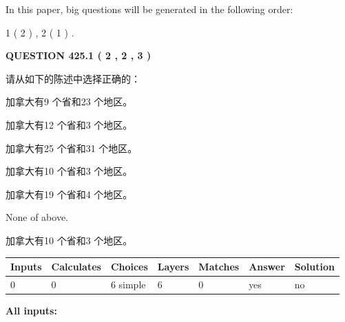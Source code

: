 \documentclass{ctexart}
\begin{document}
   
   
\vspace{0.2in}
   
In this paper, big questions will be generated in the following order: 
   
   
   1 ( 2 )
 ,
   2 ( 1 )
 .
  
\vspace{0.2in}
  
{\textbf{\Large{QUESTION
425.1 
 ( 2 , 2 , 3 )
}}}
  
  
请从如下的陈述中选择正确的：
 
 
加拿大有9 个省和23 个地区。
 
 
加拿大有12 个省和3 个地区。
 
 
加拿大有25 个省和31 个地区。
 
 
加拿大有10 个省和3 个地区。
 
 
加拿大有19 个省和4 个地区。
 
 
 None of above.
 
 
\noindent{}
 
 
加拿大有10 个省和3 个地区。
 
 
\noindent{}
 
 
   
   
   
   
\noindent\begin{tabular}{|l|l|l|l|l|l|l|}
 \hline
Inputs & Calculates & Choices & Layers & Matches & Answer & Solution \\ \hline
 0  & 
 0  & 
 6
  simple  
  & 
 6  & 
 0  & 
  yes & 
  no 
  \\ \hline
 \end{tabular}
   
   
   
   
\noindent{}
   
   
   
   
\noindent\vspace{0.1in}\hspace{-0.08in} {\textbf{\Large{All inputs: }}}
   
\end{document}
